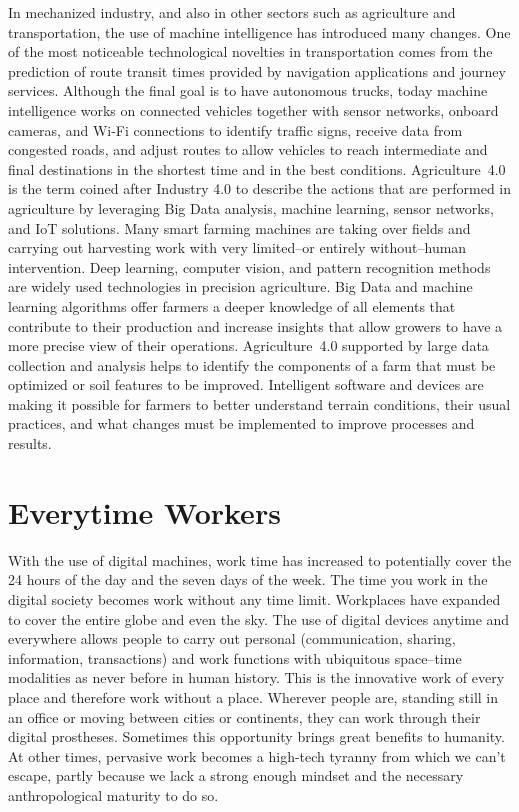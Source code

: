 In mechanized industry, and also in other sectors such as agriculture and transportation, the use of machine intelligence has introduced many changes. One of the most noticeable technological novelties in transportation comes from the prediction of route transit times provided by navigation applications and journey services. Although the final goal is to have autonomous trucks, today machine intelligence works on connected vehicles together with sensor networks, onboard cameras, and Wi-Fi connections to identify traffic signs, receive data from congested roads, and adjust routes to allow vehicles to reach intermediate and final destinations in the shortest time and in the best conditions. Agriculture~4.0 is the term coined after Industry 4.0 to describe the actions that are performed in agriculture by leveraging Big Data analysis, machine learning, sensor networks, and IoT solutions. Many smart farming machines are taking over fields and carrying out harvesting work with very limited--or entirely without--human intervention. Deep learning, computer vision, and pattern recognition methods are widely used technologies in precision agriculture. Big Data and machine learning algorithms offer farmers a deeper knowledge of all elements that contribute to their production and increase insights that allow growers to have a more precise view of their operations. Agriculture~4.0 supported by large data collection and analysis helps to identify the components of a farm that must be optimized or soil features to be improved. Intelligent software and devices are making it possible for farmers to better understand terrain conditions, their usual practices, and what changes must be implemented to improve processes and results.

\section{\label{sec:6.2}Everytime Workers}

With the use of digital machines, work time has increased to potentially cover the 24 hours of the day and the seven days of the week. The time you work in the digital society becomes work without any time limit. Workplaces have expanded to cover the entire globe and even the sky. The use of digital devices anytime and everywhere allows people to carry out personal (communication, sharing, information, transactions) and work functions with ubiquitous space--time modalities as never before in human history. This is the innovative work of every place and therefore work without a place. Wherever people are, standing still in an office or moving between cities or continents, they can work through their digital prostheses. Sometimes this opportunity brings great benefits to humanity. At other times, pervasive work becomes a high-tech tyranny from which we can't escape, partly because we lack a strong enough mindset and the necessary anthropological maturity to do so.


